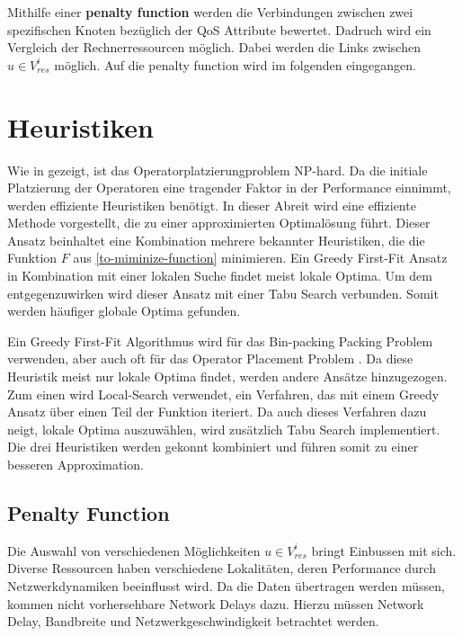 \documentclass{article}
\begin{document}
Mithilfe einer \textbf{penalty function} werden die  Verbindungen zwischen zwei spezifischen Knoten bezüglich der QoS Attribute bewertet. Dadruch wird ein Vergleich 
der Rechnerressourcen möglich. Dabei werden die Links zwischen $u \in V_{res}^i$ möglich. Auf die penalty function wird im folgenden eingegangen.




\section{Heuristiken} \label{Heurisiken}
Wie in \cite{cardellini-optimal_operatorplc} gezeigt, ist das 
Operatorplatzierungproblem NP-hard.
Da die initiale Platzierung der Operatoren eine tragender Faktor
in der Performance einnimmt, werden effiziente Heuristiken benötigt. 
In dieser Abreit wird eine effiziente Methode vorgestellt, die 
zu einer approximierten Optimalösung führt. 
Dieser Ansatz beinhaltet eine Kombination mehrere bekannter Heuristiken, die die Funktion $F$ aus \ref{to-miminize-function} minimieren.  
Ein Greedy First-Fit Ansatz in Kombination mit einer lokalen Suche findet meist lokale Optima. 
Um dem entgegenzuwirken wird dieser Ansatz mit einer Tabu Search verbunden. 
Somit werden häufiger \cite{efficient-operator-placement} globale Optima gefunden. 

Ein Greedy First-Fit Algorithmus wird für das Bin-packing Packing Problem verwenden, 
aber auch oft für das Operator Placement Problem \cite{k7}\cite{k8}.
Da diese Heuristik meist nur lokale Optima findet, werden andere Ansätze hinzugezogen. 
Zum einen wird Local-Search verwendet, ein Verfahren, 
das mit einem Greedy Ansatz über einen Teil der Funktion iteriert. Da auch dieses
Verfahren dazu neigt, lokale Optima auszuwählen, wird zusätzlich Tabu Search implementiert. 
Die drei Heuristiken werden gekonnt kombiniert und führen somit zu einer besseren Approximation. 

\subsection{Penalty Function} 
Die Auswahl von verschiedenen Möglichkeiten $u \in V_{res}^i$ bringt Einbussen mit sich. Diverse Ressourcen haben verschiedene Lokalitäten,
deren Performance durch Netzwerkdynamiken beeinflusst wird. Da die Daten übertragen werden müssen, kommen nicht vorhersehbare Network Delays dazu. Hierzu müssen Network Delay, 
Bandbreite und Netzwerkgeschwindigkeit\cite{efficient-operator-placement} betrachtet werden.
\end{document}
